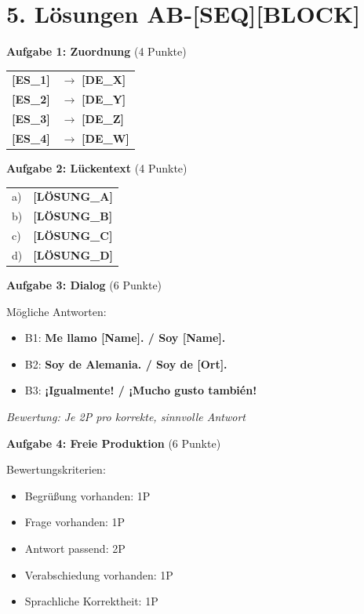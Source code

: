 \documentclass[11pt, a4paper]{article}
\newcommand{\fachfarbe}{spanisch}
\newcommand{\sequenz}{[SEQ]}
\newcommand{\block}{[BLOCK]}
\newcommand{\loesung}[1]{\textcolor{loesung}{\textbf{#1}}}
\newcommand{\es}[1]{\textcolor{\fachfarbe}{\textbf{#1}}}
\begin{document}
\section*{5. Lösungen AB-\sequenz\block}

\textbf{Aufgabe 1: Zuordnung} (4 Punkte)

\begin{tabular}{ll}
\es{[ES\_1]} & $\rightarrow$ \loesung{[DE\_X]} \\
\es{[ES\_2]} & $\rightarrow$ \loesung{[DE\_Y]} \\
\es{[ES\_3]} & $\rightarrow$ \loesung{[DE\_Z]} \\
\es{[ES\_4]} & $\rightarrow$ \loesung{[DE\_W]} \\
\end{tabular}

\vspace{1em}

\textbf{Aufgabe 2: Lückentext} (4 Punkte)

\begin{tabular}{ll}
a) & \loesung{[LÖSUNG\_A]} \\
b) & \loesung{[LÖSUNG\_B]} \\
c) & \loesung{[LÖSUNG\_C]} \\
d) & \loesung{[LÖSUNG\_D]} \\
\end{tabular}

\vspace{1em}

\textbf{Aufgabe 3: Dialog} (6 Punkte)

Mögliche Antworten:
\begin{itemize}
    \item B1: \loesung{Me llamo [Name]. / Soy [Name].}
    \item B2: \loesung{Soy de Alemania. / Soy de [Ort].}
    \item B3: \loesung{¡Igualmente! / ¡Mucho gusto también!}
\end{itemize}

\textit{Bewertung: Je 2P pro korrekte, sinnvolle Antwort}

\vspace{1em}

\textbf{Aufgabe 4: Freie Produktion} (6 Punkte)

Bewertungskriterien:
\begin{itemize}
    \item Begrüßung vorhanden: 1P
    \item Frage vorhanden: 1P
    \item Antwort passend: 2P
    \item Verabschiedung vorhanden: 1P
    \item Sprachliche Korrektheit: 1P
\end{itemize}
\end{document}
